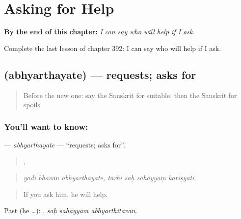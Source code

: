 
\chapter{Asking for Help}
\label{ch:sa-asking-for-help}

\begin{chapteropening}
\textbf{By the end of this chapter:} \emph{I can say who will help if I ask.}

Complete the last lesson of chapter 392: I can say who will help if I ask.
\end{chapteropening}

\section[\texorpdfstring{\sk{अभ्यर्थयते} (abhyarthayate)}{अभ्यर्थयते (abhyarthayate)}]{ (abhyarthayate) — requests; asks for}

\label{lesson:SA-C392-abhyarthayate}



\begin{quote}
Before the new one: say the Sanskrit for suitable, then the Sanskrit for spoils.
\end{quote}

\subsection*{You'll want to know: }
\textbf{} — \emph{abhyarthayate} — \textquotedblleft{}requests; asks for\textquotedblright{}.

\begin{quote}
  ,    
\end{quote}

\begin{quote}
\emph{yadi bhavān abhyarthayate, tarhi saḥ sāhāyyaṃ kariṣyati.}
\end{quote}

\begin{quote}
If you ask him, he will help.
\end{quote}

Past (he …):   , \emph{saḥ sāhāyyam abhyarthitavān}.

